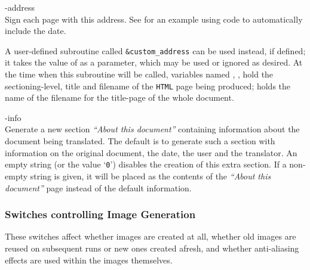 \begin{htmllist}
%
%

\item [ -address \Meta{author-address}\label{address}]
\\
Sign each page with this address.\html{\\}
See  for an example using \Perl{} code
to automatically include the date.

\begin{changebar}
A user-defined \Perl{} subroutine called \texttt{\&custom\_address}
can be used instead, if defined; it takes the value of 
as a parameter, which may be used or ignored as desired.
At the time when this subroutine will be called,
variables named , , 
hold the sectioning-level, title and filename of the \texttt{HTML} page
being produced;  holds the name of the filename for the title-page
of the whole document.
\end{changebar}


\item [ -info \Meta{string}\label{infostring}]
\\
Generate a new section \emph{``About this document'' } containing information
about the document being translated. The default is to generate such a section
with information on the original document, the date, the user and the translator.
An empty string (or the value `\texttt{0}')
disables the creation of this extra section.\html{\\}
If a non-empty string is given, it will be placed as the contents of the
\emph{``About this document'' } page instead of the default information.
%
\end{htmllist}


\subsubsection{Switches controlling Image Generation}
%
These switches affect whether images are created at all, whether
old images are reused on subsequent runs or new ones created afresh,
and whether anti-aliasing effects are used within the images themselves.

